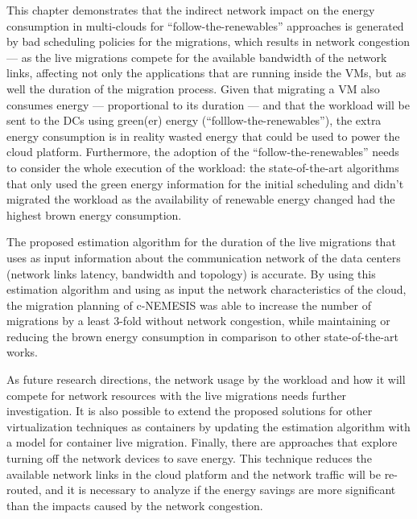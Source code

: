 This chapter demonstrates that the indirect network impact on the energy consumption in multi-clouds for ``follow-the-renewables'' approaches is generated by bad scheduling policies for the migrations, which results in network congestion --- as the live migrations compete for the available bandwidth of the network links, affecting not only the applications that are running inside the VMs, but as well the duration of the migration process. Given that migrating a VM also consumes energy --- proportional to its duration --- and that the workload will be sent to the DCs using green(er) energy (``folllow-the-renewables''), the extra energy consumption is in reality wasted energy that could be used to power the cloud platform. Furthermore, the adoption of the ``follow-the-renewables'' needs to consider the whole execution of the workload:  the state-of-the-art algorithms that only used the green energy information for the initial scheduling and didn't migrated the workload as the availability of renewable energy changed had the highest brown energy consumption. 

The proposed estimation algorithm for the duration of the live migrations that uses as input information about the communication network of the data centers (network links latency, bandwidth and topology) is accurate. By using this estimation algorithm and using as input the network characteristics of the cloud, the migration planning of c-NEMESIS was able to increase the number of migrations by a least 3-fold without network congestion, while maintaining or reducing the brown energy consumption in comparison to other state-of-the-art works.

As future research directions, the network usage by the workload and how it will compete for network resources with the live migrations needs further investigation. It is also possible to extend the proposed solutions for other virtualization techniques as containers by updating the estimation algorithm with a model for container live migration. Finally, there are approaches that explore turning off the network devices to save energy. This technique reduces the available network links in the cloud platform and the network traffic will be re-routed, and it is necessary to analyze if the energy savings are more significant than the impacts caused by the network congestion.




